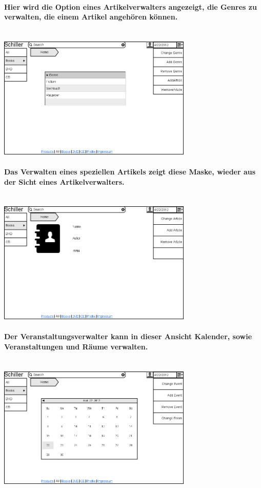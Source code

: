 \documentclass[a4paper]{article}
\begin{document}
\paragraph{Hier wird die Option eines Artikelverwalters angezeigt, die Genres zu verwalten, die einem Artikel angehören können.\\ \\}
\includegraphics[width=350px]{16ChangeGenre.png}

\paragraph{Das Verwalten eines speziellen Artikels zeigt diese Maske, wieder aus der Sicht eines Artikelverwalters.\\ \\}
\includegraphics[width=350px]{17ChangeArticle.png}

\paragraph{Der Veranstaltungsverwalter kann in dieser Ansicht Kalender, sowie Veranstaltungen und Räume verwalten.\\ \\}
\includegraphics[width=350px]{18ChangeCalender.png}
\end{document}
